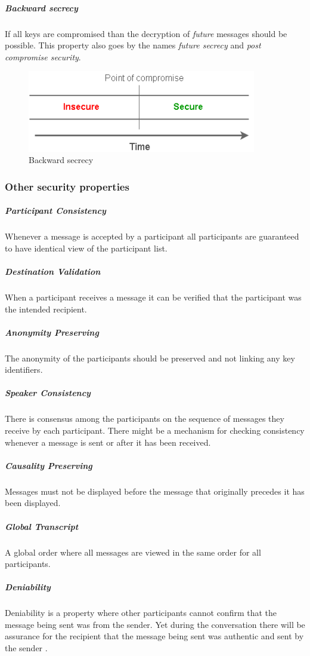 \subparagraph{Backward secrecy}
If all keys are compromised than the decryption of \emph{future} messages should be possible. This property also goes by the names \emph{future secrecy} and \emph{post compromise security}. 

\begin{figure}[H]
	\centering
	\includegraphics[width=10cm]{figures/backwardsecrecy.png}
	\caption{Backward secrecy}
	\label{fig:backward}
\end{figure}


\subsubsection{Other security properties}


\subparagraph{Participant Consistency} 
Whenever a message is accepted by a participant all participants are guaranteed to have identical view of the participant list.

\subparagraph{Destination Validation}
When a participant receives a message it can be verified that the participant was the intended recipient.

\subparagraph{Anonymity Preserving} 
The anonymity of the participants should be preserved and not linking any key identifiers.

\subparagraph{Speaker Consistency} 
There is consensus among the participants on the sequence of messages they receive by each participant. There might be a mechanism for checking consistency whenever a message is sent or after it has been received.

\subparagraph{Causality Preserving}
Messages must not be displayed before the message that originally precedes it has been displayed.

\subparagraph{Global Transcript} 
A global order where all messages are viewed in the same order for all participants.

\subparagraph{Deniability}
Deniability is a property where other participants cannot confirm that the message being sent was from the sender. Yet during the conversation there will be assurance for the recipient that the message being sent was authentic and sent by the sender \cite{sok}.

